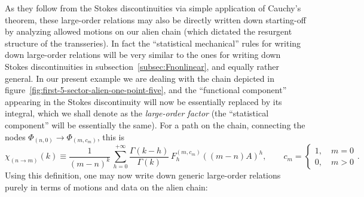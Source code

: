 \documentclass[11pt,a4paper]{article}
\newcommand{\be}{\begin{equation}}
\newcommand{\ee}{\end{equation}}
\begin{document}
As they follow from the Stokes discontinuities via simple application of Cauchy's theorem, these large-order relations may also be directly written down starting-off by analyzing allowed motions on our alien chain (which dictated the resurgent structure of the transseries). In fact the ``statistical mechanical'' rules for writing down large-order relations will be very similar to the ones for writing down Stokes discontinuities in subsection~\ref{subsec:Fnonlinear}, and equally rather general. In our present example we are dealing with the chain depicted in figure~\ref{fig:first-5-sector-alien-one-point-five}, and the ``functional component'' appearing in the Stokes discontinuity will now be essentially replaced by its integral, which we shall denote as the \textit{large-order factor} (the ``statistical component'' will be essentially the same). For a path on the chain, connecting the nodes $\Phi_{(n,0)}\rightarrow \Phi_{(m,c_m)}$, this is
%
\be
\label{large-order-factor}
\chi_{(n\rightarrow m)} (k) \equiv \frac{1}{(m-n)^k}\, \sum_{h=0}^{+\infty} \frac{\Gamma(k-h)}{\Gamma(k)}\, F_h^{(m,c_m)} \left( \left(m-n\right) A\right)^h, \qquad c_m = \left\{ \begin{array}{l} 1, \quad m=0 \\ 0, \quad m>0 \end{array} \right. .
\ee
%
\noindent
Using this definition, one may now write down generic large-order relations purely in terms of motions and data on the alien chain:
\end{document}
